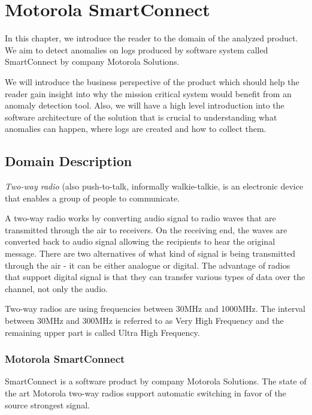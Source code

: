 \chapter{Motorola SmartConnect}
\label{smart-connect}
In this chapter, we introduce the reader to the domain of the analyzed product.
We aim to detect anomalies on logs produced by software system called SmartConnect by company Motorola Solutions.

We will introduce the business perspective of the product which should help the reader gain insight into why the mission critical system would benefit from an anomaly detection tool.
Also, we will have a high level introduction into the software architecture of the solution that is crucial to understanding what anomalies can happen, where logs are created and how to collect them.

\section{Domain Description}

\textit{Two-way radio} (also push-to-talk, informally walkie-talkie\cite{twowayradio}, is an electronic device that enables a group of people to communicate.

A two-way radio works by converting audio signal to radio waves that are transmitted through the air to receivers. On the receiving end, the waves are converted back to audio signal allowing the recipients to hear the original message.
There are two alternatives of what kind of signal is being transmitted through the air - it can be either analogue or digital.
The advantage of radios that support digital signal is that they can transfer various types of data over the channel, not only the audio.

Two-way radios are using frequencies between 30MHz and 1000MHz. The interval between 30MHz and 300MHz is referred to as Very High Frequency and the remaining upper part is called Ultra High Frequency.



\subsection{Motorola SmartConnect}

SmartConnect is a software product by company Motorola Solutions. 
The state of the art Motorola two-way radios\cite{apxp25radio} support automatic switching in favor of the source strongest signal.

